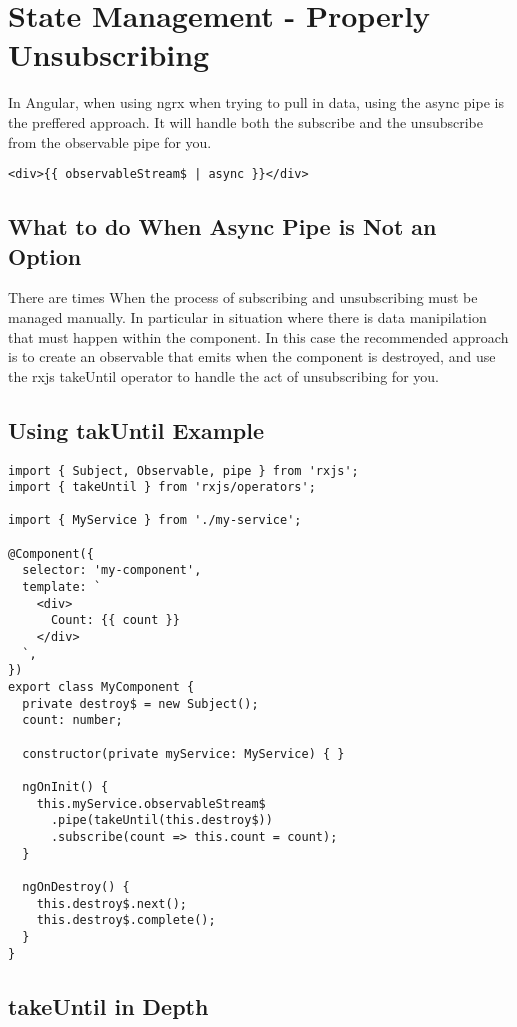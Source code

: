 
\chapter{ State Management - Properly Unsubscribing }

In Angular, when using ngrx when trying to pull in data, using the async pipe is
the preffered approach. It will handle both the subscribe and the unsubscribe
from the observable pipe for you.

\begin{lstlisting}
<div>{{ observableStream$ | async }}</div>
\end{lstlisting}

\section{ What to do When Async Pipe is Not an Option }
There are times When the process of subscribing and unsubscribing must be
managed manually. In particular in situation where there is data manipilation
that must happen within the component. In this case the recommended approach
is to create an observable that emits when the component is destroyed, and use
the rxjs takeUntil operator to handle the act of unsubscribing for you.

\section{Using takUntil Example}

\begin{lstlisting}
import { Subject, Observable, pipe } from 'rxjs';
import { takeUntil } from 'rxjs/operators';

import { MyService } from './my-service';

@Component({
  selector: 'my-component',
  template: `
    <div>
      Count: {{ count }}
    </div>
  `,
})
export class MyComponent {
  private destroy$ = new Subject();
  count: number;

  constructor(private myService: MyService) { }

  ngOnInit() {
    this.myService.observableStream$
      .pipe(takeUntil(this.destroy$))
      .subscribe(count => this.count = count);
  }

  ngOnDestroy() {
    this.destroy$.next();
    this.destroy$.complete();
  }
}
\end{lstlisting}

\section{takeUntil in Depth}

